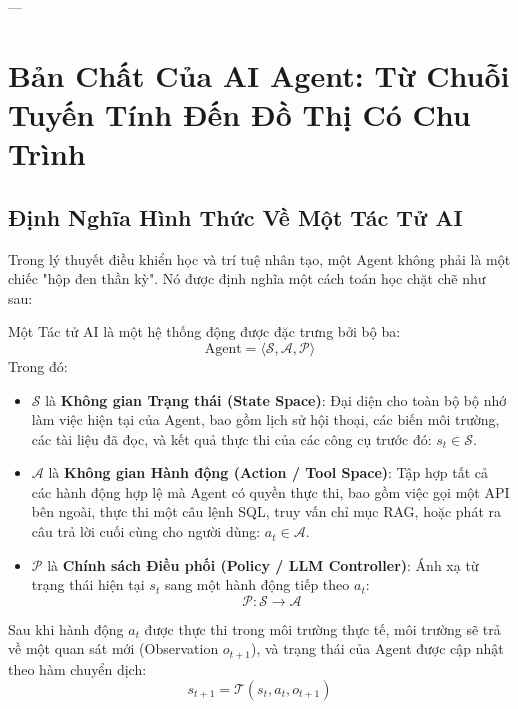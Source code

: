 ---

\section{Bản Chất Của AI Agent: Từ Chuỗi Tuyến Tính Đến Đồ Thị Có Chu Trình}
\label{sec:agent-fundamentals}

\subsection{Định Nghĩa Hình Thức Về Một Tác Tử AI}
Trong lý thuyết điều khiển học và trí tuệ nhân tạo, một Agent không phải là một chiếc "hộp đen thần kỳ". Nó được định nghĩa một cách toán học chặt chẽ như sau:

\begin{definition}
Một Tác tử AI là một hệ thống động được đặc trưng bởi bộ ba:
\begin{equation}
\text{Agent} = \langle \mathcal{S}, \mathcal{A}, \mathcal{P} \rangle
\end{equation}
Trong đó:
\begin{itemize}
  \item $\mathcal{S}$ là \textbf{Không gian Trạng thái (State Space)}: Đại diện cho toàn bộ bộ nhớ làm việc hiện tại của Agent, bao gồm lịch sử hội thoại, các biến môi trường, các tài liệu đã đọc, và kết quả thực thi của các công cụ trước đó: $s_t \in \mathcal{S}$.
  \item $\mathcal{A}$ là \textbf{Không gian Hành động (Action / Tool Space)}: Tập hợp tất cả các hành động hợp lệ mà Agent có quyền thực thi, bao gồm việc gọi một API bên ngoài, thực thi một câu lệnh SQL, truy vấn chỉ mục RAG, hoặc phát ra câu trả lời cuối cùng cho người dùng: $a_t \in \mathcal{A}$.
  \item $\mathcal{P}$ là \textbf{Chính sách Điều phối (Policy / LLM Controller)}: Ánh xạ từ trạng thái hiện tại $s_t$ sang một hành động tiếp theo $a_t$:
  \begin{equation}
  \mathcal{P}: \mathcal{S} \to \mathcal{A}
  \end{equation}
\end{itemize}
Sau khi hành động $a_t$ được thực thi trong môi trường thực tế, môi trường sẽ trả về một quan sát mới (Observation $o_{t+1}$), và trạng thái của Agent được cập nhật theo hàm chuyển dịch:
\begin{equation}
s_{t+1} = \mathcal{T}(s_t, a_t, o_{t+1})
\end{equation}
\end{definition}

